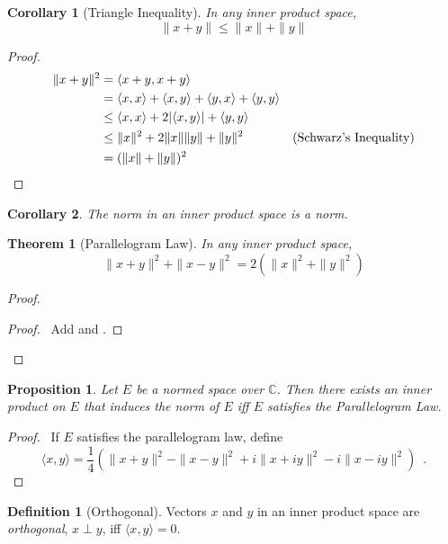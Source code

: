 \documentclass{book}
\let\qed\relax
\newtheorem{prop}[ax]{Proposition}
\newtheorem{cor}{Corollary}[ax]
\newtheorem{thm}[ax]{Theorem}
\theoremstyle{definition}
\newtheorem{df}[ax]{Definition}
\begin{document}
\begin{cor}[Triangle Inequality]
In any inner product space,
\[ \| x + y \| \leq \| x \| + \| y \| \]
\end{cor}

\begin{proof}
\pf
\begin{align*}
\|x+y\|^2 & = \langle x+y, x+y \rangle \\
& = \langle x,x \rangle + \langle x,y \rangle + \langle y,x \rangle + \langle y,y \rangle \\
& \leq \langle x,x \rangle + 2 |\langle x,y \rangle| + \langle y,y \rangle \\
& \leq \|x\|^2 + 2 \|x\| \|y\| + \|y\|^2 & (\text{Schwarz's Inequality}) \\
& = (\|x\| + \|y\|)^2 & \qed
\end{align*}
\end{proof}

\begin{cor}
The norm in an inner product space is a norm.
\end{cor}

\begin{thm}[Parallelogram Law]
In any inner product space,
\[ \|x+y\|^2 + \|x-y\|^2 = 2 (\|x\|^2 + \|y\|^2) \]
\end{thm}

\begin{proof}
\pf
{}
\qedstep
\begin{proof}
	\pf\ Add  and .
\end{proof}
\qed
\end{proof}

\begin{prop}
Let $E$ be a normed space over $\mathbb{C}$. Then there exists an inner product on $E$ that induces the norm of $E$ iff $E$ satisfies the Parallelogram Law.
\end{prop}

\begin{proof}
\pf\ If $E$ satisfies the parallelogram law, define \[ \langle x,y \rangle = \frac{1}{4}(\|x+y\|^2 - \|x-y\|^2 + i \|x+iy\|^2 -i\|x-iy\|^2) \enspace . \]
\end{proof}

\begin{df}[Orthogonal]
Vectors $x$ and $y$ in an inner product space are \emph{orthogonal}, $x \perp y$, iff $\langle x,y \rangle = 0$.
\end{df}
\end{document}
